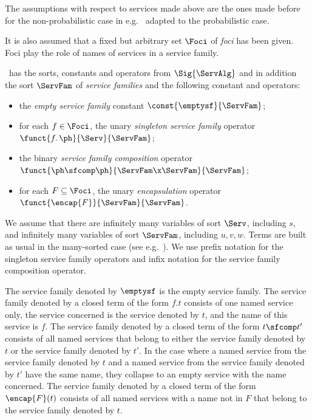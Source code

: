 \documentclass{llncs}
\begin{document}
The assumptions with respect to services made above are the ones made 
before for the non-probabilistic case in e.g.~\cite{BM12b} adapted to 
the probabilistic case.

It is also assumed that a fixed but arbitrary set $\Foci$ of
\emph{foci} has been given.
Foci play the role of names of services in a service family. 

\SFA\ has the sorts, constants and operators from $\Sig{\ServAlg}$ and
in addition the sort $\ServFam$ of \emph{service families} and the 
following constant and operators:
\begin{itemize}
\item
the
\emph{empty service family} constant $\const{\emptysf}{\ServFam}$;
\item
for each $f \in \Foci$, the unary
\emph{singleton service family} operator
$\funct{\mathop{f{.}} \ph}{\Serv}{\ServFam}$;
\item
the binary
\emph{service family composition} operator
$\funct{\ph \sfcomp \ph}{\ServFam \x \ServFam}{\ServFam}$;
\item
for each $F \subseteq \Foci$, the unary
\emph{encapsulation} operator $\funct{\encap{F}}{\ServFam}{\ServFam}$.
\end{itemize}
We assume that there are infinitely many variables of sort $\Serv$,
including $s$, and infinitely many variables of sort $\ServFam$,
including $u,v,w$.
Terms are built as usual in the many-sorted case
(see e.g.~\cite{ST99a,Wir90a}).
We use prefix notation for the singleton service family operators and
infix notation for the service family composition operator.

The service family denoted by $\emptysf$ is the empty service family.
The service family denoted by a closed term of the form $f.t$ consists 
of one named service only, the service concerned is the service denoted 
by $t$, and the name of this service is $f$.
The service family denoted by a closed term of the form
$t \sfcomp t'$ consists of all named services that belong to either the
service family denoted by $t$ or the service family denoted by $t'$.
In the case where a named service from the service family denoted by
$t$ and a named service from the service family denoted by $t'$ have
the same name, they collapse to an empty service with the name
concerned.
The service family denoted by a closed term of the form $\encap{F}(t)$ 
consists of all named services with a name not in $F$ that belong to
the service family denoted by $t$.
\end{document}
